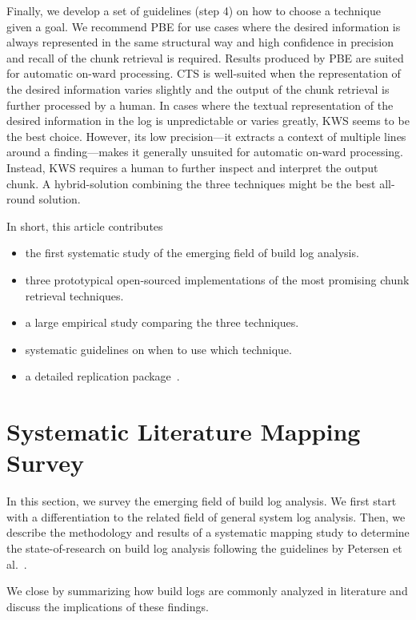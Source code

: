 Finally, we develop a set of guidelines (step 4) on how to choose a
technique given a goal.
We recommend PBE for use cases where the desired information is always
represented in the same structural way and high confidence in
precision and recall of the chunk retrieval is required.
Results
produced by PBE are suited for automatic on-ward processing.
CTS is
well-suited when the representation of the desired information varies
slightly and the output of the chunk retrieval is further processed by
a human.
In cases where the textual representation of the desired
information in the log is unpredictable or varies greatly, KWS seems
to be the best choice.
However, its low precision---it extracts a
context of multiple lines around a finding---makes it generally
unsuited for automatic on-ward processing.
Instead, KWS requires a human
to further inspect and interpret the output chunk.
A hybrid-solution combining the three techniques might be the best
all-round solution.

In short, this article contributes
\begin{itemize}
\item the first systematic study of the emerging field of build log
analysis.
\item three prototypical open-sourced implementations of the most
promising chunk retrieval techniques.
\item a large empirical study comparing the three techniques.
\item systematic guidelines on when to use which technique.
\item a detailed replication package~\cite{brandt2020chunk-replication}.
\end{itemize}

\section{Systematic Literature Mapping Survey}
\label{sec:survey}

In this section, we survey the emerging field of build log
analysis.
We first start with a differentiation to the related field of general
system log analysis.
Then, we describe the methodology and results of a systematic mapping
study to
determine the state-of-research on build log analysis following the
guidelines by Petersen et
al.~\cite{petersen2008systematic,petersen2015guidelines}.

We close by summarizing how build logs are commonly
analyzed in literature and discuss the implications of these findings.


